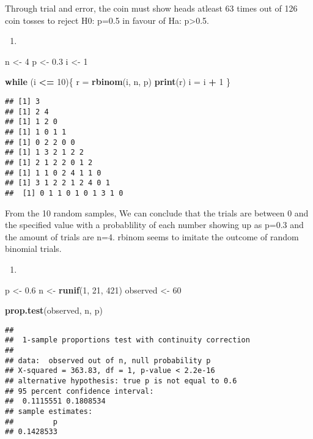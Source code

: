 \documentclass[
]{article}
\newenvironment{Shaded}{\begin{snugshade}}{\end{snugshade}}
\newcommand{\ControlFlowTok}[1]{\textcolor[rgb]{0.13,0.29,0.53}{\textbf{#1}}}
\newcommand{\DecValTok}[1]{\textcolor[rgb]{0.00,0.00,0.81}{#1}}
\newcommand{\FloatTok}[1]{\textcolor[rgb]{0.00,0.00,0.81}{#1}}
\newcommand{\KeywordTok}[1]{\textcolor[rgb]{0.13,0.29,0.53}{\textbf{#1}}}
\newcommand{\NormalTok}[1]{#1}
\newcommand{\OperatorTok}[1]{\textcolor[rgb]{0.81,0.36,0.00}{\textbf{#1}}}
\newcommand{\StringTok}[1]{\textcolor[rgb]{0.31,0.60,0.02}{#1}}
\begin{document}
Through trial and error, the coin must show heads atleast 63 times out
of 126 coin tosses to reject H0: p=0.5 in favour of Ha:
p\textgreater0.5.

\begin{enumerate}
\def\labelenumi{\alph{enumi})}
\setcounter{enumi}{2}
\item
\end{enumerate}

\begin{Shaded}
\begin{Highlighting}[]
\NormalTok{n <-}\StringTok{ }\DecValTok{4}
\NormalTok{p <-}\StringTok{ }\FloatTok{0.3}
\NormalTok{i <-}\StringTok{ }\DecValTok{1}

\ControlFlowTok{while}\NormalTok{ (i }\OperatorTok{<=}\StringTok{ }\DecValTok{10}\NormalTok{)\{}
\NormalTok{  r =}\StringTok{ }\KeywordTok{rbinom}\NormalTok{(i, n, p)}
  \KeywordTok{print}\NormalTok{(r)}
\NormalTok{  i =}\StringTok{ }\NormalTok{i }\OperatorTok{+}\StringTok{ }\DecValTok{1}
\NormalTok{\}}
\end{Highlighting}
\end{Shaded}

\begin{verbatim}
## [1] 3
## [1] 2 4
## [1] 1 2 0
## [1] 1 0 1 1
## [1] 0 2 2 0 0
## [1] 1 3 2 1 2 2
## [1] 2 1 2 2 0 1 2
## [1] 1 1 0 2 4 1 1 0
## [1] 3 1 2 2 1 2 4 0 1
##  [1] 0 1 1 0 1 0 1 3 1 0
\end{verbatim}

From the 10 random samples, We can conclude that the trials are between
0 and the specified value with a probablility of each number showing up
as p=0.3 and the amount of trials are n=4. rbinom seems to imitate the
outcome of random binomial trials.

\begin{enumerate}
\def\labelenumi{\alph{enumi})}
\setcounter{enumi}{3}
\item
\end{enumerate}

\begin{Shaded}
\begin{Highlighting}[]
\NormalTok{p <-}\StringTok{ }\FloatTok{0.6}
\NormalTok{n <-}\StringTok{ }\KeywordTok{runif}\NormalTok{(}\DecValTok{1}\NormalTok{, }\DecValTok{21}\NormalTok{, }\DecValTok{421}\NormalTok{)}
\NormalTok{observed <-}\StringTok{ }\DecValTok{60}

\KeywordTok{prop.test}\NormalTok{(observed, n, p)}
\end{Highlighting}
\end{Shaded}

\begin{verbatim}
## 
##  1-sample proportions test with continuity correction
## 
## data:  observed out of n, null probability p
## X-squared = 363.83, df = 1, p-value < 2.2e-16
## alternative hypothesis: true p is not equal to 0.6
## 95 percent confidence interval:
##  0.1115551 0.1808534
## sample estimates:
##         p 
## 0.1428533
\end{verbatim}
\end{document}
